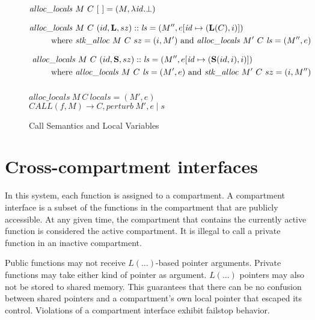 \documentclass{article}
\begin{document}
\begin{figure}

  \[\begin{split}
  \mathit{alloc\_locals} ~ & M ~ C ~ [~] = (M, \lambda \mathit{id} . \bot) \\[0.75em]
  \mathit{alloc\_locals} ~ & M ~ C ~ (id,\mathbf{L},sz)::\mathit{ls} =
  (M'', e[\mathit{id} \mapsto (\mathbf{L}(C),i)]) \\
  \textnormal{where } & \mathit{stk\_alloc} ~ M ~ C ~ sz = (i, M')
  \textnormal{ and } \mathit{alloc\_locals} ~ M' ~ C ~ \mathit{ls} = (M'', e) \\[0.75em]
  \mathit{alloc\_locals} & ~ M ~ C ~ (id,\mathbf{S},sz)::\mathit{ls} =
  (M'', e[\mathit{id} \mapsto (\mathbf{S}(id,i),i)]) \\
  \textnormal{where } & \mathit{alloc\_locals} ~ M ~ C ~ \mathit{ls} = (M', e)
  \textnormal{ and } \mathit{stk\_alloc} ~ M' ~ C ~ sz = (i, M'') \\[0.75em]
  \end{split}\]
      
              {\(\mathit{alloc\_locals} ~ M ~ C ~ \mathit{locals} = (M',e)\)}
              {\(\mathit{CALL}(f,M) \longrightarrow
                C,\mathit{perturb} ~ M',e \mid s\)}
  \caption{Call Semantics and Local Variables}
  \label{fig:callret}

\end{figure}

\section{Cross-compartment interfaces}
\label{sec:interfaces}

In this system, each function is assigned to a compartment. A compartment interface
is a subset of the functions in the compartment that are publicly accessible.
At any given time, the compartment that contains the currently active function is
considered the active compartment. It is illegal to call a private function in an
inactive compartment.

Public functions may not receive \(L(\dots)\)-based pointer arguments.
Private functions may take either kind of pointer as argument. \(L(\dots)\) pointers
may also not be stored to shared memory. This guarantees that there can be no
confusion between shared pointers and a compartment's own local pointer that
escaped its control. Violations of a compartment interface exhibit failstop behavior.
\end{document}
